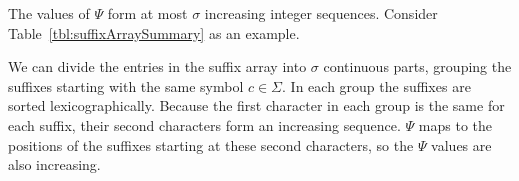 \begin{Theorem}
  \label{thm:psiValuesIncreasing}
  The values of $\Psi$ form at most $\sigma$ increasing integer sequences. Consider Table~\ref{tbl:suffixArraySummary} as an example.
\end{Theorem}

\begin{Proof}
  We can divide the entries in the suffix array into $\sigma$ continuous parts, grouping the suffixes starting with the same symbol $c \in \Sigma$. In each group the suffixes are sorted lexicographically. Because the first character in each group is the same for each suffix, their second characters form an increasing sequence. $\Psi$ maps to the positions of the suffixes starting at these second characters, so the $\Psi$ values are also increasing.
\end{Proof}
